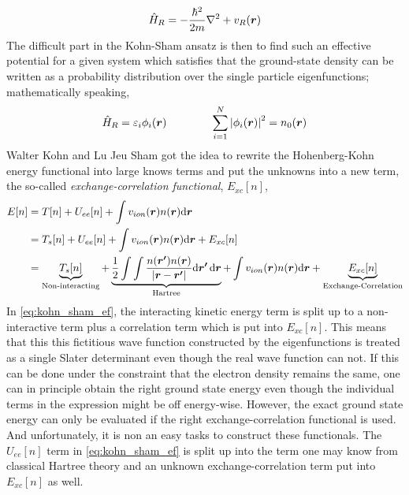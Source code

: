 \begin{equation} 
\label{eq:reference_system_KS}
\hat{H}_R = - \dfrac{\hbar^2}{2m} \nabla^2 + v_R \qty(\bm{r})
\end{equation}
The difficult part in the Kohn-Sham ansatz is then to find such an effective potential for a given system which satisfies that the ground-state density can be written as a probability distribution over the single particle eigenfunctions; mathematically speaking,
\begin{equation}
\hat{H}_R = \varepsilon_i \phi_i \qty(\bm{r}) \qquad \qquad \sum_{i=1}^N \abs{\phi_i \qty(\bm{r})}^2 = n_0 \qty(\bm{r})
\end{equation}
Walter Kohn and Lu Jeu Sham got the idea to rewrite the Hohenberg-Kohn energy functional into large knows terms and put the unknowns into a new term, the so-called \emph{exchange-correlation functional}, $E_{xc}[n]$,
\begin{equation}\label{eq:kohn_sham_ef}
\begin{split}
    E[n] &= T[n] + U_{ee} [n] + \int v_{ion} \qty(\bm{r}) n \qty(\bm{r}) \mathrm{d} \bm{r} \\
    &=T_s\qty[n] + U_{ee} \qty[n] + \int v_{ion} \qty(\bm{r}) n \qty(\bm{r}) \mathrm{d}\bm{r} + E_{xc} \qty[n] \\
    &= \underbrace{T_s \qty[n]}_\text{Non-interacting} + \underbrace{\dfrac{1}{2} \int \int \dfrac{n\qty(\bm{r'}) n\qty(\bm{r})}{\qty|\bm{r}-\bm{r'}|} \mathrm{d}\bm{r'} \, \mathrm{d}\bm{r}}_\text{Hartree} + \int v_{ion} \qty(\bm{r}) n \qty(\bm{r}) \mathrm{d}\bm{r} + \underbrace{ E_{xc} \qty[n]}_\text{Exchange-Correlation}
\end{split}
\end{equation}
In \eqref{eq:kohn_sham_ef}, the interacting kinetic energy term is split up to a non-interactive term plus a correlation term which is put into $E_{xc}[n]$. This means that this this fictitious wave function constructed by the eigenfunctions is treated as a single Slater determinant even though the real wave function can not. If this can be done under the constraint that the electron density remains the same, one can in principle obtain the right ground state energy even though the individual terms in the expression might be off energy-wise. However, the exact ground state energy can only be evaluated if the right exchange-correlation functional is used. And unfortunately, it is non an easy tasks to construct these functionals. The $U_{ee}[n]$ term in \ref{eq:kohn_sham_ef} is split up into the term one may know from classical Hartree theory and an unknown exchange-correlation term put into $E_{xc}[n]$ as well. \\

